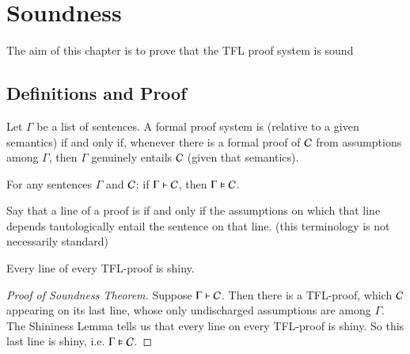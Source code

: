%
%
%
\chapter{Soundness}
\label{sound} %

The aim of this chapter is to prove that the TFL proof system is sound

\section{ Definitions and Proof}

\begin{definition}
    Let $\Gamma$ be a list of sentences. A formal proof system is  (relative to a given semantics) if and only if, whenever there is a formal proof of $\mathcal{C}$ from assumptions among $\Gamma$, then $\Gamma$ genuinely entails $\mathcal{C}$ (given that semantics). 
\end{definition}


\begin{theorem}
    For any sentences $\Gamma$ and $\mathcal{C}$: if $\Gamma \vdash \mathcal{C}$, then $\Gamma \vDash \mathcal{C}$.
\end{theorem}

\begin{definition}
    Say that a line of a proof is  if and only if the assumptions on which that line depends tautologically entail the sentence on that line. (this terminology is not necessarily standard)
\end{definition}


\begin{lemma}
    Every line of every TFL-proof is shiny.
\end{lemma}



\begin{proof}[Proof of Soundness Theorem]
    Suppose $\Gamma \vdash \mathcal{C}$. Then there is a TFL-proof, which $\mathcal{C}$ appearing on its last line, whose only undischarged assumptions are among $\Gamma$. The Shininess Lemma tells us that every line on every TFL-proof is shiny. So this last line is shiny, i.e. $\Gamma \vDash \mathcal{C}$.
\end{proof}

